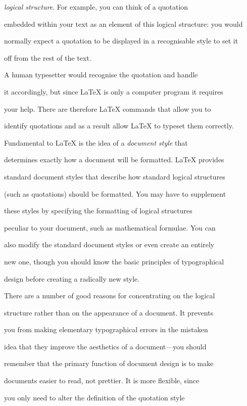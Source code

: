 {\em logical structure\/}.  For example, you can think of a quotation

embedded within your text as an element of this logical structure: you would

normally expect a quotation to be displayed in a recognisable style to set it

off from the rest of the text.

A human typesetter would recognise the quotation and handle

it accordingly, but since \LaTeX{} is only a computer program it requires

your help.  There are therefore \LaTeX{} commands that allow you to

identify quotations and as a result allow \LaTeX{} to typeset them correctly.



Fundamental to \LaTeX{} is the idea of a {\em document style\/} that

determines exactly how a document will be formatted.  \LaTeX{} provides

standard document styles that describe how standard logical structures

(such as quotations) should be formatted.  You may have to supplement

these styles by specifying the formatting of logical structures

peculiar to your document, such as mathematical formulae.  You can

also modify the standard document styles or even create an entirely

new one, though you should know the basic principles of typographical

design before creating a radically new style.



There are a number of good reasons for concentrating on the logical

structure rather than on the appearance of a document.  It prevents

you from making elementary typographical errors in the mistaken

idea that they improve the aesthetics of a document---you should

remember that the primary function of document design is to make

documents easier to read, not prettier.  It is more flexible, since

you only need to alter the definition of the quotation style

